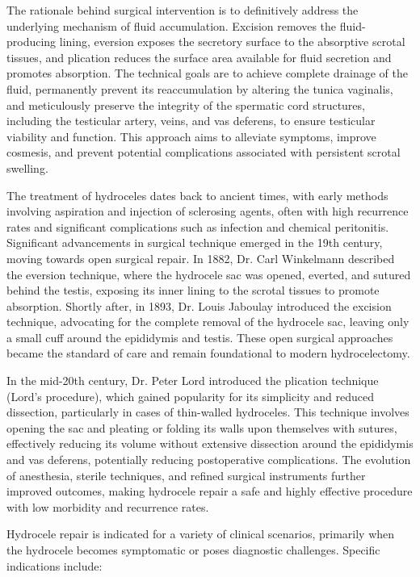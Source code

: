 The rationale behind surgical intervention is to definitively address the underlying mechanism of fluid accumulation. Excision removes the fluid-producing lining, eversion exposes the secretory surface to the absorptive scrotal tissues, and plication reduces the surface area available for fluid secretion and promotes absorption. The technical goals are to achieve complete drainage of the fluid, permanently prevent its reaccumulation by altering the tunica vaginalis, and meticulously preserve the integrity of the spermatic cord structures, including the testicular artery, veins, and vas deferens, to ensure testicular viability and function. This approach aims to alleviate symptoms, improve cosmesis, and prevent potential complications associated with persistent scrotal swelling.

The treatment of hydroceles dates back to ancient times, with early methods involving aspiration and injection of sclerosing agents, often with high recurrence rates and significant complications such as infection and chemical peritonitis. Significant advancements in surgical technique emerged in the 19th century, moving towards open surgical repair. In 1882, Dr. Carl Winkelmann described the eversion technique, where the hydrocele sac was opened, everted, and sutured behind the testis, exposing its inner lining to the scrotal tissues to promote absorption. Shortly after, in 1893, Dr. Louis Jaboulay introduced the excision technique, advocating for the complete removal of the hydrocele sac, leaving only a small cuff around the epididymis and testis. These open surgical approaches became the standard of care and remain foundational to modern hydrocelectomy.

In the mid-20th century, Dr. Peter Lord introduced the plication technique (Lord's procedure), which gained popularity for its simplicity and reduced dissection, particularly in cases of thin-walled hydroceles. This technique involves opening the sac and pleating or folding its walls upon themselves with sutures, effectively reducing its volume without extensive dissection around the epididymis and vas deferens, potentially reducing postoperative complications. The evolution of anesthesia, sterile techniques, and refined surgical instruments further improved outcomes, making hydrocele repair a safe and highly effective procedure with low morbidity and recurrence rates.

Hydrocele repair is indicated for a variety of clinical scenarios, primarily when the hydrocele becomes symptomatic or poses diagnostic challenges. Specific indications include:

